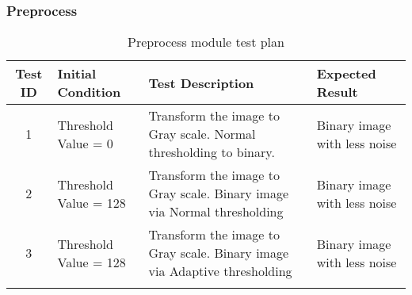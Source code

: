 \documentclass[a4paper,10pt]{iesreport}
\begin{document}
\subsubsection*{Preprocess}
\begin{table}
\caption{Preprocess module test plan}
\begin{tabular}{c|p{3cm}|p{5cm}|p{3.5cm}}
\hline
\textbf{Test ID} & \textbf{Initial Condition} & \textbf{Test Description} & \textbf{Expected Result} \\ [0.3ex]
\hline
1 & Threshold Value = 0 & Transform the image to Gray scale. Normal thresholding to binary. & Binary image with less noise\\
\hline
2 & Threshold Value = 128 & Transform the image to Gray scale. Binary image via Normal thresholding & Binary image with less noise \\
\hline
3 & Threshold Value = 128 & Transform the image to Gray scale. Binary image via Adaptive thresholding & Binary image with less noise\\
\\
\hline
\end{tabular}
\label{table:nonlin}
\end{table}
\end{document}
